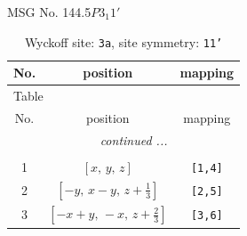 \documentclass[fleqn,8pt]{jsarticle}
\begin{document}
\setcounter{MaxMatrixCols}{32}

\renewcommand{\tablename}{Table~}
\renewcommand{\figurename}{Figure~}
\begin{center}
\LARGE
MSG No. 144.5\quad$P3_{1}1'$
\end{center}
\renewcommand{\arraystretch}{1.2}
\begin{longtable}{ccc}
\caption{Wyckoff site: {\tt 3a}, site symmetry: {\tt 11'}}
 \\
 \hline \hline
No. & position & mapping \\ \hline \endfirsthead

\multicolumn{2}{l}{\tablename\ \thetable{}} \\
 \hline \hline
No. & position & mapping \\ \hline \endhead

 \hline \hline
\multicolumn{2}{r}{\footnotesize\it continued ...} \\ \endfoot

 \hline \hline
\multicolumn{2}{r}{} \\ \endlastfoot

1 & $\left[ x,\, y,\, z \right]$ & {\tt [1,4]} \\ \hline
2 & $\left[ - y,\, x - y,\, z + \frac{1}{3} \right]$ & {\tt [2,5]} \\ \hline
3 & $\left[ - x + y,\, - x,\, z + \frac{2}{3} \right]$ & {\tt [3,6]} \\
\end{longtable}
\end{document}
